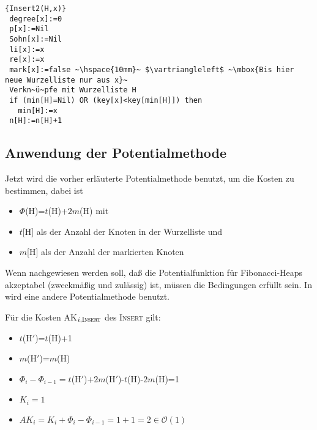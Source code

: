 \documentclass[ngerman,draft,parskip=half*,twoside]{scrreprt}
\theoremstyle{break}
\theoremstyle{nonumberbreak}
\newcommand*{\OO}{\mathcal{O}}      %
\begin{document}
\begin{Algorithmus}[H]
\begin{lstlisting}[frame=tlrb, mathescape=true, title=\textsc{Insert\textnormal{(H, x)}}, gobble=1]{Insert2(H,x)}
 degree[x]:=0
 p[x]:=Nil
 Sohn[x]:=Nil
 li[x]:=x
 re[x]:=x
 mark[x]:=false ~\hspace{10mm}~ $\vartriangleleft$ ~\mbox{Bis hier neue Wurzelliste nur aus x}~
 Verkn~ü~pfe mit Wurzelliste H
 if (min[H]=Nil) OR (key[x]<key[min[H]]) then
   min[H]:=x
 n[H]:=n[H]+1   
\end{lstlisting}
\end{Algorithmus}

\subsection{Anwendung der Potentialmethode}
Jetzt wird die vorher erläuterte Potentialmethode benutzt, um die Kosten zu bestimmen, dabei ist
\begin{itemize}
\item $\Phi$(H)=$t$(H)+$2m$(H) mit
\item $t$[H] als der Anzahl der Knoten in der Wurzelliste und
\item $m$[H] als der Anzahl der markierten Knoten
\end{itemize}
Wenn nachgewiesen werden soll, daß die Potentialfunktion für Fibonacci-Heaps akzeptabel (zweckmäßig und zulässig)
ist, müssen die Bedingungen erfüllt sein. In \cite{ottmann} wird eine andere Potentialmethode benutzt.

Für die Kosten AK$_{i, \textsc{Insert}}$ des \textsc{Insert} gilt:
\begin{itemize}
\item $t$(H$'$)=$t$(H)+1
\item $m$(H$'$)=$m$(H)
\item ${\Phi}_i-{\Phi}_{i-1}=t$(H$'$)$+2m$(H$'$)-$t$(H)-$2m$(H)=1
\item $K_i=1$
\item $AK_i =K_i +\Phi_i-\Phi_{i-1}=1+1=2 \in \OO(1)$
\end{itemize}
\end{document}
